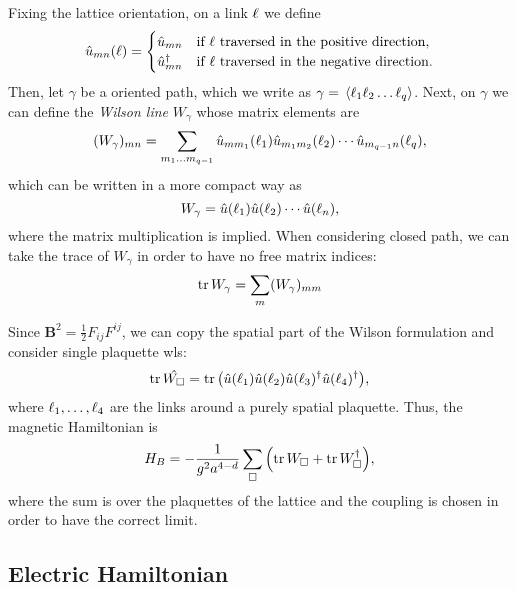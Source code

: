 Fixing the lattice orientation, on a link $\ell$ we define
\begin{equation}
    \hat{u}_{mn}(\ell) =
    \begin{cases}
        \hat{u}_{mn} & \text{if $\ell$ traversed in the positive direction}, \\
        \hat{u}_{mn}^{\dagger} & \text{if $\ell$ traversed in the negative direction}.
    \end{cases}
\end{equation}
Then, let $\gamma$ be a oriented path, which we write as $\gamma = \ev*{\link_1 \link_2 \dots \link_q}$.
Next, on $\gamma$ we can define the \emph{Wilson line} $W_{\gamma}$ whose matrix elements are
\begin{equation}
    (W_{\gamma})_{mn} =
    \sum_{m_1 \dots m_{q-1}}
        \hat{u}_{m m_1} (\ell_1)
        \hat{u}_{m_1 m_2} (\ell_2)
        \cdots
        \hat{u}_{m_{q-1} n} (\ell_q),
\end{equation}
which can be written in a more compact way as
\begin{equation}
    W_{\gamma} =
        \hat{u}(\ell_1)
        \hat{u}(\ell_2)
        \cdots
        \hat{u}(\ell_n),
\end{equation}
where the matrix multiplication is implied.
When considering closed path, we can take the trace of $W_{\gamma}$ in order to have no free matrix indices:
\begin{equation}
    \tr W_{\gamma} = \sum_{m} (W_{\gamma})_{mm}
\end{equation}

Since $\mathbf{B}^2 = \frac{1}{2} F_{ij} F^{ij}$, we can copy the spatial part of the Wilson formulation and consider single plaquette \ac{wl}s:
\begin{equation}
    \tr \hat{W_{\square}} = \tr \qty(
        \hat{u}(\ell_1) \hat{u}(\ell_2) \hat{u}(\ell_3)^{\dagger}  \hat{u}(\ell_4)^{\dagger}
    ),
\end{equation}
where $\ell_1, \dots, \ell_4$ are the links around a purely spatial plaquette.
Thus, the magnetic Hamiltonian is
\begin{equation}
    H_B = - \frac{1}{g^2 a^{4-d}} \sum_{\square} \qty( \tr W_{\square} + \tr W_{\square}^{\dagger} ),
\end{equation}
where the sum is over the plaquettes of the lattice and the coupling is chosen in order to have the correct limit.


\subsection{Electric Hamiltonian}
\label{sub:electric_hamiltonian}

